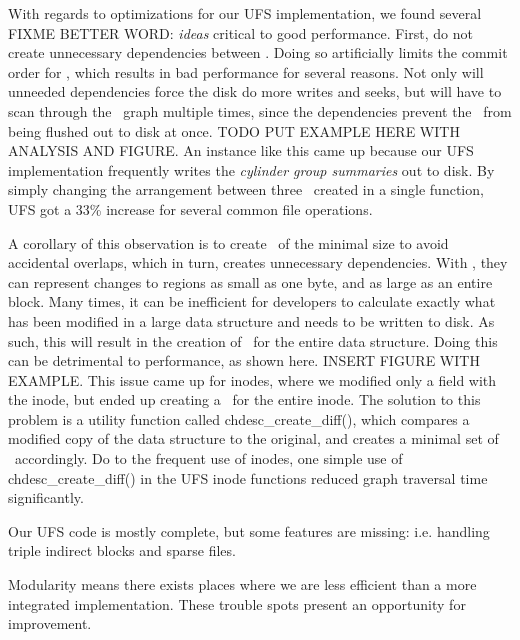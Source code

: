 With regards to optimizations for our UFS implementation, we found several
FIXME BETTER WORD: \emph{ideas} critical to good performance. First, do not
create unnecessary dependencies between \chdescs. Doing so artificially limits
the commit order for \chdescs, which results in bad performance for several
reasons. Not only will unneeded dependencies force the disk do more writes and
seeks, but \Kudos will have to scan through the \chdesc\ graph
multiple times, since the dependencies prevent the \chdescs\ from being
flushed out to disk at once. TODO PUT EXAMPLE HERE WITH ANALYSIS AND FIGURE. 
An instance like this came up because our UFS implementation frequently writes
the \emph{cylinder group summaries} out to disk. By simply changing the
arrangement between three \chdescs\ created in a single function, UFS got a
33\% increase for several common file operations.

A corollary of this observation is to create \chdescs\ of the minimal size
to avoid accidental overlaps, which in turn, creates unnecessary dependencies.
With \chdescs, they can represent changes to regions as small as one byte, and
as large as an entire block. Many times, it can be inefficient for developers
to calculate exactly what has been modified in a large data structure and needs
to be written to disk. As such, this will result in the creation of \chdescs\ 
for the entire data structure. Doing this can be detrimental to performance,
as shown here. INSERT FIGURE WITH EXAMPLE. This issue came up for inodes, where
we modified only a field with the inode, but ended up creating a \chdesc\ 
for the entire inode. The solution to this problem is a utility
function called chdesc\_create\_diff(), which compares a modified copy of the
data structure to the original, and creates a minimal set of \chdescs\ 
accordingly. Do to the frequent use of inodes, one simple use of
chdesc\_create\_diff() in the UFS inode functions reduced \chdescs graph
traversal time significantly.

Our UFS code is mostly complete, but some features are missing:
i.e. handling triple indirect blocks and sparse files.

Modularity means there exists places where we are less efficient
than a more integrated implementation. These trouble spots present
an opportunity for improvement.

